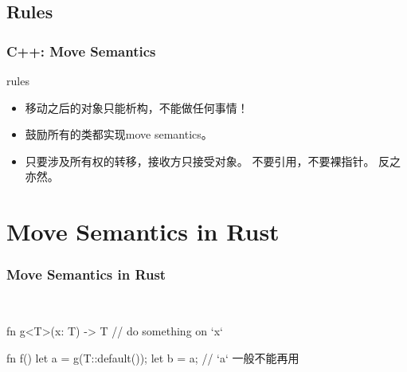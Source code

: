 \documentclass[UTF8,lualatex]{ctexbeamer}
\begin{document}

\subsection{Rules}

\begin{frame}
    \frametitle{C++: Move Semantics}
    \begin{alertblock}{rules}
    \begin{itemize}
        \item 移动之后的对象只能析构，不能做任何事情！
        \item 鼓励所有的类都实现move semantics。
        \item 只要涉及所有权的转移，接收方只接受对象。
            不要引用，不要裸指针。
            反之亦然。
    \end{itemize}
    \end{alertblock}
\end{frame}


\section{Move Semantics in Rust}

\begin{frame}[fragile]
    \frametitle{Move Semantics in Rust}
    \begin{block}{~}
        \begin{rustcode}
            fn g<T>(x: T) -> T {
                // do something on `x`
            }

            fn f() {
                let a = g(T::default());
                let b = a;
                // `a` 一般不能再用
            }
        \end{rustcode}
    \end{block}
\end{frame}
\end{document}
